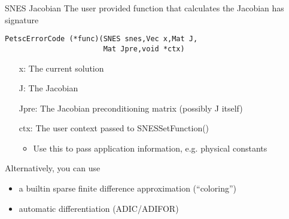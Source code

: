 \begin{frame}[fragile]{SNES Jacobian}
The user provided function that calculates the Jacobian has signature
\begin{verbatim}
PetscErrorCode (*func)(SNES snes,Vec x,Mat J,
                       Mat Jpre,void *ctx)
\end{verbatim}

\begin{itemize}
  \item[{\kb x}:] The current solution
  \item[{\kb J}:] The Jacobian
  \item[{\kb Jpre}:] The Jacobian preconditioning matrix (possibly J itself)
  \item[{\kb ctx}:] The user context passed to {\kb SNESSetFunction()}
  \begin{itemize}
    \item Use this to pass application information, e.g. physical constants
  \end{itemize}
\end{itemize}

Alternatively, you can use
\begin{itemize}
  \item a builtin sparse finite difference approximation (``coloring'')
  \item automatic differentiation (ADIC/ADIFOR)
\end{itemize}

\end{frame}
